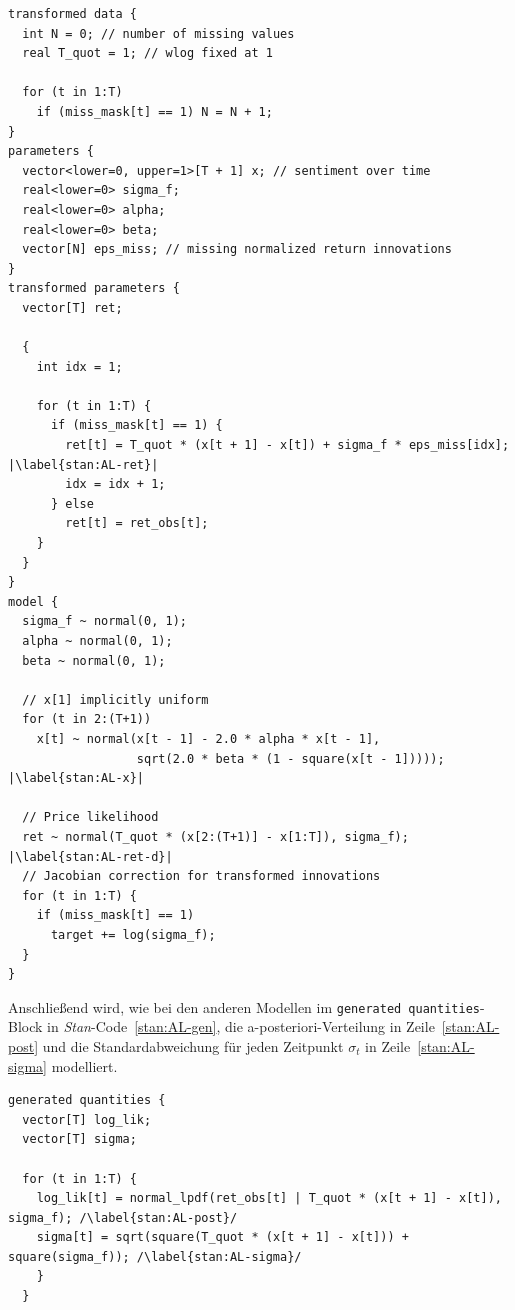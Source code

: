 \documentclass[ngerman]{ttlab-qualify}
\begin{document}
\begin{lstlisting}[style=custom, escapechar=|,caption={Teil-Modell nach \parencite{bertschinger:2019, AL:2008}}, label= {stan:AL-param}]
transformed data {
  int N = 0; // number of missing values
  real T_quot = 1; // wlog fixed at 1
  
  for (t in 1:T)
    if (miss_mask[t] == 1) N = N + 1;
}
parameters {
  vector<lower=0, upper=1>[T + 1] x; // sentiment over time
  real<lower=0> sigma_f;
  real<lower=0> alpha;
  real<lower=0> beta;
  vector[N] eps_miss; // missing normalized return innovations
}
transformed parameters {
  vector[T] ret;
  
  {
    int idx = 1;
    
    for (t in 1:T) {
      if (miss_mask[t] == 1) {
        ret[t] = T_quot * (x[t + 1] - x[t]) + sigma_f * eps_miss[idx]; |\label{stan:AL-ret}|
        idx = idx + 1;
      } else
        ret[t] = ret_obs[t];
    }
  }
}
model {
  sigma_f ~ normal(0, 1);
  alpha ~ normal(0, 1);
  beta ~ normal(0, 1);

  // x[1] implicitly uniform
  for (t in 2:(T+1))
    x[t] ~ normal(x[t - 1] - 2.0 * alpha * x[t - 1],
                  sqrt(2.0 * beta * (1 - square(x[t - 1])))); |\label{stan:AL-x}|
                  
  // Price likelihood
  ret ~ normal(T_quot * (x[2:(T+1)] - x[1:T]), sigma_f); |\label{stan:AL-ret-d}|
  // Jacobian correction for transformed innovations
  for (t in 1:T) {
    if (miss_mask[t] == 1)
      target += log(sigma_f);
  }
}

\end{lstlisting}

Anschließend wird, wie bei den anderen Modellen im \verb|generated quantities|-Block in \textit{Stan}-Code~\ref{stan:AL-gen}, die a-posteriori-Verteilung in Zeile~\ref{stan:AL-post} und die Standardabweichung für jeden Zeitpunkt $\sigma_t$ in Zeile~\ref{stan:AL-sigma} modelliert.
\begin{lstlisting}[style=custom, escapechar=/,caption={Teil-Modell nach \parencite{bertschinger:2019, AL:2008}}, label= {stan:AL-gen}]
generated quantities {
  vector[T] log_lik;
  vector[T] sigma; 
           
  for (t in 1:T) {
    log_lik[t] = normal_lpdf(ret_obs[t] | T_quot * (x[t + 1] - x[t]), sigma_f); /\label{stan:AL-post}/
    sigma[t] = sqrt(square(T_quot * (x[t + 1] - x[t])) + square(sigma_f)); /\label{stan:AL-sigma}/
    }
  }
\end{lstlisting}
\end{document}
